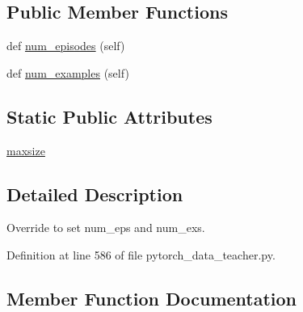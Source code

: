 \subsection*{Public Member Functions}
\begin{DoxyCompactItemize}
\item 
def \hyperlink{classparlai_1_1core_1_1pytorch__data__teacher_1_1ParlAIConcatDataset_a17a0c832fe97e4ab80906ba691d85ba3}{num\+\_\+episodes} (self)
\item 
def \hyperlink{classparlai_1_1core_1_1pytorch__data__teacher_1_1ParlAIConcatDataset_a18b104ac4b013780a973cf8655b8406a}{num\+\_\+examples} (self)
\end{DoxyCompactItemize}
\subsection*{Static Public Attributes}
\begin{DoxyCompactItemize}
\item 
\hyperlink{classparlai_1_1core_1_1pytorch__data__teacher_1_1ParlAIConcatDataset_a431fa0b54c4f0d63911c8bcaf73b8ffc}{maxsize}
\end{DoxyCompactItemize}


\subsection{Detailed Description}
\begin{DoxyVerb}Override to set num_eps and num_exs.\end{DoxyVerb}
 

Definition at line 586 of file pytorch\+\_\+data\+\_\+teacher.\+py.



\subsection{Member Function Documentation}
\mbox{\label{classparlai_1_1core_1_1pytorch__data__teacher_1_1ParlAIConcatDataset_a17a0c832fe97e4ab80906ba691d85ba3}} 
